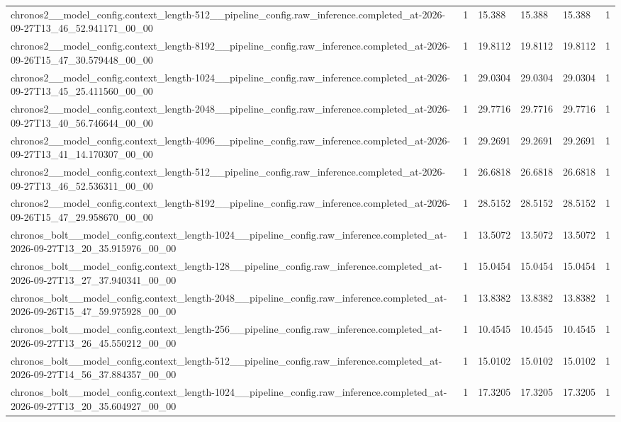 \begin{tabular}{llllll}
chronos2\_\_model\_config.context\_length-512\_\_pipeline\_config.raw\_inference.completed\_at-2026-09-27T13\_46\_52.941171\_00\_00 & 1 & 15.388 & 15.388 & 15.388 & 1 \\
chronos2\_\_model\_config.context\_length-8192\_\_pipeline\_config.raw\_inference.completed\_at-2026-09-26T15\_47\_30.579448\_00\_00 & 1 & 19.8112 & 19.8112 & 19.8112 & 1 \\
chronos2\_\_model\_config.context\_length-1024\_\_pipeline\_config.raw\_inference.completed\_at-2026-09-27T13\_45\_25.411560\_00\_00 & 1 & 29.0304 & 29.0304 & 29.0304 & 1 \\
chronos2\_\_model\_config.context\_length-2048\_\_pipeline\_config.raw\_inference.completed\_at-2026-09-27T13\_40\_56.746644\_00\_00 & 1 & 29.7716 & 29.7716 & 29.7716 & 1 \\
chronos2\_\_model\_config.context\_length-4096\_\_pipeline\_config.raw\_inference.completed\_at-2026-09-27T13\_41\_14.170307\_00\_00 & 1 & 29.2691 & 29.2691 & 29.2691 & 1 \\
chronos2\_\_model\_config.context\_length-512\_\_pipeline\_config.raw\_inference.completed\_at-2026-09-27T13\_46\_52.536311\_00\_00 & 1 & 26.6818 & 26.6818 & 26.6818 & 1 \\
chronos2\_\_model\_config.context\_length-8192\_\_pipeline\_config.raw\_inference.completed\_at-2026-09-26T15\_47\_29.958670\_00\_00 & 1 & 28.5152 & 28.5152 & 28.5152 & 1 \\
chronos\_bolt\_\_model\_config.context\_length-1024\_\_pipeline\_config.raw\_inference.completed\_at-2026-09-27T13\_20\_35.915976\_00\_00 & 1 & 13.5072 & 13.5072 & 13.5072 & 1 \\
chronos\_bolt\_\_model\_config.context\_length-128\_\_pipeline\_config.raw\_inference.completed\_at-2026-09-27T13\_27\_37.940341\_00\_00 & 1 & 15.0454 & 15.0454 & 15.0454 & 1 \\
chronos\_bolt\_\_model\_config.context\_length-2048\_\_pipeline\_config.raw\_inference.completed\_at-2026-09-26T15\_47\_59.975928\_00\_00 & 1 & 13.8382 & 13.8382 & 13.8382 & 1 \\
chronos\_bolt\_\_model\_config.context\_length-256\_\_pipeline\_config.raw\_inference.completed\_at-2026-09-27T13\_26\_45.550212\_00\_00 & 1 & 10.4545 & 10.4545 & 10.4545 & 1 \\
chronos\_bolt\_\_model\_config.context\_length-512\_\_pipeline\_config.raw\_inference.completed\_at-2026-09-27T14\_56\_37.884357\_00\_00 & 1 & 15.0102 & 15.0102 & 15.0102 & 1 \\
chronos\_bolt\_\_model\_config.context\_length-1024\_\_pipeline\_config.raw\_inference.completed\_at-2026-09-27T13\_20\_35.604927\_00\_00 & 1 & 17.3205 & 17.3205 & 17.3205 & 1 \\

\end{tabular}
